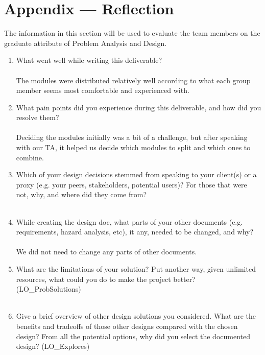 \documentclass[12pt, titlepage]{article}
\begin{document}
\newpage{}

\section*{Appendix --- Reflection}


The information in this section will be used to evaluate the team members on the
graduate attribute of Problem Analysis and Design.



\begin{enumerate}
  \item What went well while writing this deliverable? \\ \\
  The modules were distributed relatively well according to what each group member seems most comfortable and experienced with.
  \item What pain points did you experience during this deliverable, and how
    did you resolve them?\\ \\
    Deciding the modules initially was a bit of a challenge, but after speaking with our TA, it helped us decide which modules to split and which ones to combine.
  \item Which of your design decisions stemmed from speaking to your client(s)
  or a proxy (e.g. your peers, stakeholders, potential users)? For those that
  were not, why, and where did they come from?\\ \\
  \item While creating the design doc, what parts of your other documents (e.g.
  requirements, hazard analysis, etc), it any, needed to be changed, and why?\\ \\
We did not need to change any parts of other documents.
  
  \item What are the limitations of your solution?  Put another way, given
  unlimited resources, what could you do to make the project better? (LO\_ProbSolutions)\\ \\
  \item Give a brief overview of other design solutions you considered.  What
  are the benefits and tradeoffs of those other designs compared with the chosen
  design?  From all the potential options, why did you select the documented design?
  (LO\_Explores)\\ \\
\end{enumerate}
\end{document}
